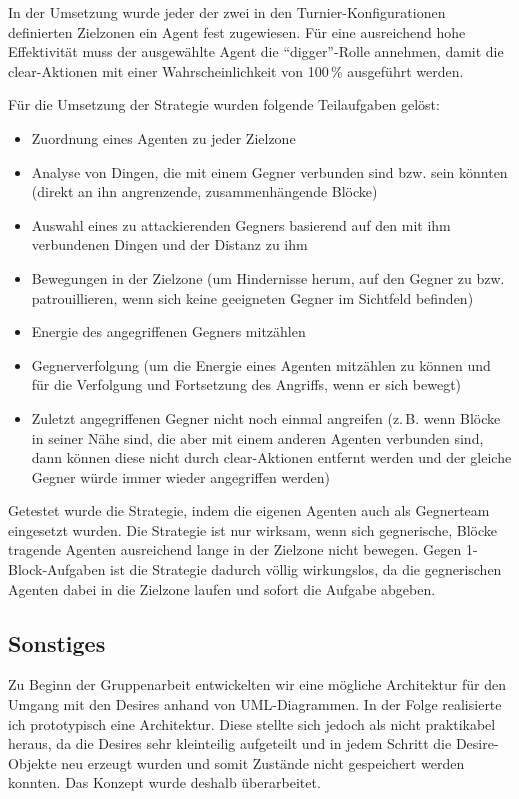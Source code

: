 \documentclass[runningheads]{llncs}
\begin{document}
In der Umsetzung wurde jeder der zwei in den Turnier-Konfigurationen definierten Zielzonen ein Agent fest zugewiesen. Für eine ausreichend hohe Effektivität muss der ausgewählte Agent die "`digger"'-Rolle annehmen, damit die clear-Aktionen mit einer Wahrscheinlichkeit von 100\,\% ausgeführt werden.

Für die Umsetzung der Strategie wurden folgende Teilaufgaben gelöst:
\begin{itemize}
\item{Zuordnung eines Agenten zu jeder Zielzone}
\item{Analyse von Dingen, die mit einem Gegner verbunden sind bzw. sein könnten (direkt an ihn angrenzende, zusammenhängende Blöcke)}
\item{Auswahl eines zu attackierenden Gegners basierend auf den mit ihm verbundenen Dingen und der Distanz zu ihm}
\item{Bewegungen in der Zielzone (um Hindernisse herum, auf den Gegner zu bzw. patrouillieren, wenn sich keine geeigneten Gegner im Sichtfeld befinden)}
\item{Energie des angegriffenen Gegners mitzählen}
\item{Gegnerverfolgung (um die Energie eines Agenten mitzählen zu können und für die Verfolgung und Fortsetzung des Angriffs, wenn er sich bewegt)}
\item{Zuletzt angegriffenen Gegner nicht noch einmal angreifen (z.\,B. wenn Blöcke in seiner Nähe sind, die aber mit einem anderen Agenten verbunden sind, dann können diese nicht durch clear-Aktionen entfernt werden und der gleiche Gegner würde immer wieder angegriffen werden)}
\end{itemize}

Getestet wurde die Strategie, indem die eigenen Agenten auch als Gegnerteam eingesetzt wurden. Die Strategie ist nur wirksam, wenn sich gegnerische, Blöcke tragende Agenten ausreichend lange in der Zielzone nicht bewegen. Gegen 1-Block-Aufgaben ist die Strategie dadurch völlig wirkungslos, da die gegnerischen Agenten dabei in die Zielzone laufen und sofort die Aufgabe abgeben.

\subsection{Sonstiges}
Zu Beginn der Gruppenarbeit entwickelten wir eine mögliche Architektur für den Umgang mit den Desires anhand von UML-Diagrammen. In der Folge realisierte ich prototypisch eine Architektur. Diese stellte sich jedoch als nicht praktikabel heraus, da die Desires sehr kleinteilig aufgeteilt und in jedem Schritt die Desire-Objekte neu erzeugt wurden und somit Zustände nicht gespeichert werden konnten. Das Konzept wurde deshalb überarbeitet.
\end{document}
